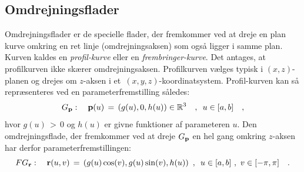 
\subsection{Omdrejningsflader} \label{subsecOmdrejningsflader}
Omdrejningsflader er de specielle flader, der
fremkommer ved at dreje en plan kurve omkring en
ret linje (omdrejningsaksen) som også ligger i
samme plan. Kurven kaldes en {\em{{profil-kurve}}}
eller en {\em{{frembringer-kurve}}}. Det antages,
at profilkurven ikke skærer omdrejningsaksen.
Profilkurven vælges typisk i $(x, z)$-planen og
drejes om $z$-aksen i et
$\,(x,y,z)$-koordinatsystem. Profil-kurven kan så
repræsenteres ved en parameterfremstilling
således:
\begin{equation}
G_{\bf p} : \quad {\bf p}(u) \, = \, \left(g(u), 0, h(u)\right)
\in \mathbb{R}^3 \quad , \, \, \,  u \in [a,b] \quad,
\end{equation}
hvor $g(u)\, > \, 0$  og $h(u)$ er givne
funktioner af parameteren $u$. Den
omdrejningsflade, der fremkommer ved at dreje
$G_{\bf p}$ en hel gang omkring $z$-aksen har
derfor parameterfremstillingen:
\begin{equation} \label{eqFG}
FG_{\bf r} : \quad {\bf r}(u,v) \, = \, \left(g(u)\cos(v), g(u)\sin(v),
h(u)\right) \, \, , \, \, \,  u \in [a,b] \, \,
, \, \,  v \in [-\pi, \pi] \quad.
\end{equation}


